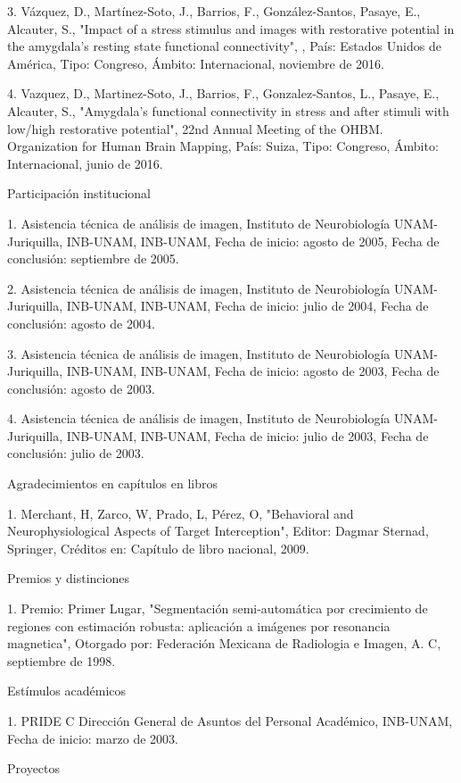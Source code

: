 \documentclass[12pt]{article}
\begin{document}
3. Vázquez, D., Martínez-Soto, J., Barrios, F., González-Santos, Pasaye, E., Alcauter, S., "Impact of a stress stimulus and 
images with restorative potential in the amygdala's resting state functional connectivity", , País: Estados Unidos de 
América, Tipo: Congreso, Ámbito: Internacional, noviembre de 2016.

4. Vazquez, D., Martinez-Soto, J., Barrios, F., Gonzalez-Santos, L., Pasaye, E., Alcauter, S., "Amygdala's functional 
connectivity in stress and after stimuli with low/high restorative potential", 22nd Annual Meeting of the OHBM. 
Organization for Human Brain Mapping, País: Suiza, Tipo: Congreso, Ámbito: Internacional, junio de 2016.

Participación institucional

1. Asistencia técnica de análisis de imagen, Instituto de Neurobiología UNAM-Juriquilla, INB-UNAM, INB-UNAM, Fecha de 
inicio: agosto de 2005, Fecha de conclusión: septiembre de 2005.

2. Asistencia técnica de análisis de imagen, Instituto de Neurobiología UNAM-Juriquilla, INB-UNAM, INB-UNAM, Fecha de 
inicio: julio de 2004, Fecha de conclusión: agosto de 2004.

3. Asistencia técnica de análisis de imagen, Instituto de Neurobiología UNAM-Juriquilla, INB-UNAM, INB-UNAM, Fecha de 
inicio: agosto de 2003, Fecha de conclusión: agosto de 2003.

4. Asistencia técnica de análisis de imagen, Instituto de Neurobiología UNAM-Juriquilla, INB-UNAM, INB-UNAM, Fecha de 
inicio: julio de 2003, Fecha de conclusión: julio de 2003.


Agradecimientos en capítulos en libros

1. Merchant, H, Zarco, W, Prado, L, Pérez, O, "Behavioral and Neurophysiological Aspects of Target Interception", Editor: 
Dagmar Sternad, Springer, Créditos en: Capítulo de libro nacional, 2009.


Premios y distinciones

1. Premio: Primer Lugar, "Segmentación semi-automática por crecimiento de regiones con estimación robusta: aplicación a 
imágenes por resonancia magnetica", Otorgado por: Federación Mexicana de Radiologia e Imagen, A. C, septiembre de 1998.

Estímulos académicos

1. PRIDE C Dirección General de Asuntos del Personal Académico, INB-UNAM, Fecha de inicio: marzo de 2003.

Proyectos
\end{document}
